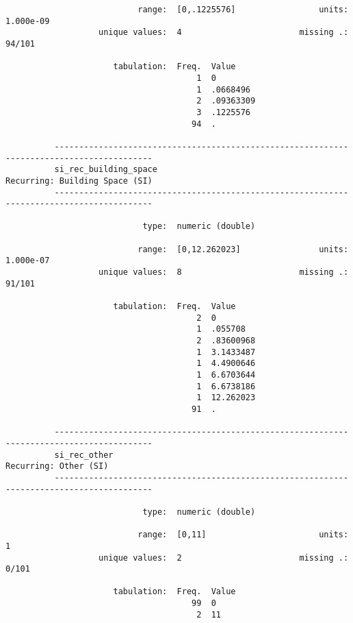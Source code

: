 \documentclass{article}
\begin{document}
\begin{verbatim}
                           range:  [0,.1225576]                 units:  1.000e-09
                   unique values:  4                        missing .:  94/101
          
                      tabulation:  Freq.  Value
                                       1  0
                                       1  .0668496
                                       2  .09363309
                                       3  .1225576
                                      94  .
          
          ------------------------------------------------------------------------------------------
          si_rec_building_space                                       Recurring: Building Space (SI)
          ------------------------------------------------------------------------------------------
          
                            type:  numeric (double)
          
                           range:  [0,12.262023]                units:  1.000e-07
                   unique values:  8                        missing .:  91/101
          
                      tabulation:  Freq.  Value
                                       2  0
                                       1  .055708
                                       2  .83600968
                                       1  3.1433487
                                       1  4.4900646
                                       1  6.6703644
                                       1  6.6738186
                                       1  12.262023
                                      91  .
          
          ------------------------------------------------------------------------------------------
          si_rec_other                                                         Recurring: Other (SI)
          ------------------------------------------------------------------------------------------
          
                            type:  numeric (double)
          
                           range:  [0,11]                       units:  1
                   unique values:  2                        missing .:  0/101
          
                      tabulation:  Freq.  Value
                                      99  0
                                       2  11
          

\end{verbatim}
\end{document}

